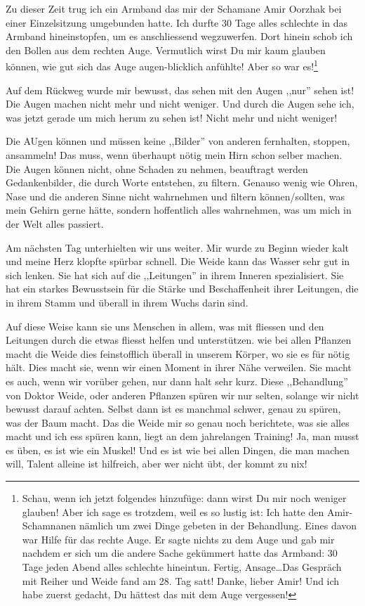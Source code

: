 \documentclass[11pt,titlepage,a5paper]{book}
\begin{document}
Zu dieser Zeit trug ich ein Armband das mir der Schamane Amir Oorzhak bei einer Einzelsitzung umgebunden hatte. Ich durfte 30 Tage alles schlechte in das Armband hineinstopfen, um es anschliessend wegzuwerfen. Dort hinein schob ich den Bollen aus dem rechten Auge. Vermutlich wirst Du mir kaum glauben können, wie gut sich das Auge augen-blicklich anfühlte! Aber so war es!\footnote{Schau, wenn ich jetzt folgendes hinzufüge: dann wirst Du mir noch weniger glauben! Aber ich sage es trotzdem, weil es so lustig ist: Ich hatte den Amir-Schamnanen nämlich um zwei Dinge gebeten in der Behandlung. Eines davon war Hilfe für das rechte Auge. Er sagte nichts zu dem Auge und gab mir nachdem er sich um die andere Sache gekümmert hatte das Armband: 30 Tage jeden Abend alles schlechte hineintun. Fertig, Ansage\dots Das Gespräch mit Reiher und Weide fand am 28. Tag satt! Danke, lieber Amir! Und ich habe zuerst gedacht, Du hättest das mit dem Auge vergessen! }

Auf dem Rückweg wurde mir bewusst, das sehen mit den Augen ,,nur'' sehen ist! Die Augen machen nicht mehr und nicht weniger. Und durch die Augen sehe ich, was jetzt gerade um mich herum zu sehen ist!
Nicht mehr und nicht weniger!

Die AUgen können und müssen keine ,,Bilder'' von anderen fernhalten, stoppen, ansammeln!  Das muss, wenn überhaupt nötig mein Hirn schon selber machen. Die Augen können nicht, ohne Schaden zu nehmen, beauftragt werden Gedankenbilder, die durch Worte entstehen, zu filtern. Genauso wenig wie Ohren, Nase und die anderen Sinne nicht wahrnehmen und filtern können/sollten, was mein Gehirn gerne hätte, sondern hoffentlich alles wahrnehmen, was um mich in der Welt alles passiert.

Am nächsten Tag unterhielten wir uns weiter. Mir wurde zu Beginn wieder kalt und meine Herz klopfte spürbar schnell. Die Weide kann das Wasser sehr gut in sich lenken. Sie hat sich auf die ,,Leitungen'' in ihrem Inneren spezialisiert. Sie hat ein starkes Bewusstsein für die Stärke und Beschaffenheit ihrer Leitungen, die in ihrem Stamm und überall in ihrem Wuchs darin sind.

Auf diese Weise kann sie uns Menschen in allem, was mit fliessen und den Leitungen durch die etwas fliesst helfen und unterstützen. wie bei allen Pflanzen macht die Weide dies feinstofflich überall in unserem Körper, wo sie es für nötig hält. Dies macht sie, wenn wir einen Moment in ihrer Nähe verweilen. Sie macht es auch, wenn wir vorüber gehen, nur dann halt sehr kurz. Diese ,,Behandlung'' von Doktor Weide, oder anderen Pflanzen spüren wir nur selten, solange wir nicht bewusst darauf achten. Selbst dann ist es manchmal schwer, genau zu spüren, was der Baum macht. Das die Weide mir so genau noch berichtete, was sie alles macht und ich ess spüren kann, liegt an dem jahrelangen Training! Ja, man musst es üben, es ist wie ein Muskel! Und es ist wie bei allen Dingen, die man machen will, Talent alleine ist hilfreich, aber wer nicht übt, der kommt zu nix!
\end{document}
